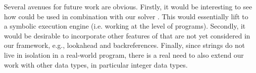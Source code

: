 

%

Several avenues for future work are obvious. Firstly, it would be interesting to
see how \expose{} could be used in combination with our solver \ostrich{}. This
would essentially lift \ostrich{} to a symbolic execution engine (i.e. working
at the level of programs). Secondly, it would be desirable to incorporate other
features of \regexp{} that are not yet considered in our framework, e.g.,
lookahead and backreferences. Finally, since strings do not live in isolation in
a real-world program, there is a real need to also extend our work with other
data types, in particular integer data types.

